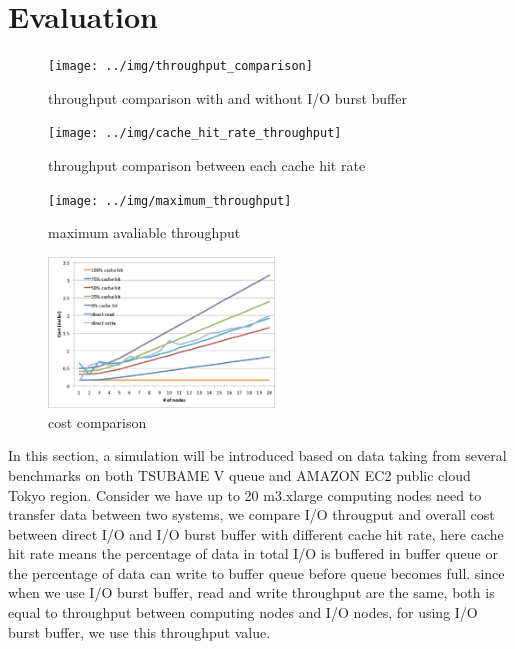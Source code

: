 \section{Evaluation}
\label{sec:evaluation}

\begin{figure}[tb]
	\centering
	\texttt{[image: ../img/throughput\_comparison]}
	\caption{throughput comparison with and without I/O burst buffer}
	\label{throughput comparison}
\end{figure}

\begin{figure}[tb]
	\centering
	\texttt{[image: ../img/cache\_hit\_rate\_throughput]}
	\caption{throughput comparison between each cache hit rate}
	\label{throughput cache rate}
\end{figure}

\begin{figure}[tb]
	\centering
	\texttt{[image: ../img/maximum\_throughput]}
	\caption{maximum avaliable throughput}
	\label{maximum throughput}
\end{figure}

\begin{figure}[tb]
	\centering
	\includegraphics[width=6cm]{../img/cost}
	\caption{cost comparison}
	\label{cost}
\end{figure}


In this section, a simulation will be introduced based on data taking from several benchmarks on both TSUBAME V queue and AMAZON EC2 public cloud Tokyo region.%
Consider we have up to 20 m3.xlarge computing nodes need to transfer data between two systems, we compare I/O througput and overall cost between direct I/O and I/O burst buffer with different cache hit rate, here cache hit rate means the percentage of data in total I/O is buffered in buffer queue or the percentage of data can write to buffer queue before queue becomes full.
since when we use I/O burst buffer, read and write throughput are the same, both is equal to throughput between computing nodes and I/O nodes, for using I/O burst buffer, we use this throughput value.

